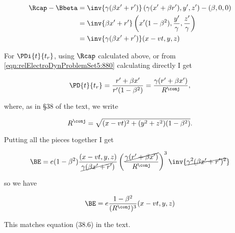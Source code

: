 \begin{align*}
\Rcap -\Bbeta
&= \inv{ \gamma (\beta x' + r') } \left( \gamma(x' + \beta r'), y', z' \right) - (\beta, 0, 0) \\
&= \inv{ \beta x' + r' } \left( x'(1- \beta^2), \frac{y'}{\gamma}, \frac{z'}{\gamma} \right) \\
&= \inv{\gamma (\beta x' + r')} ( x - v t, y, z)
\end{align*}

For $\PDi{t}{t_r}$, using $\Rcap$ calculated above, or from \ref{eqn:relElectroDynProblemSet5:880} calculating directly I get

\begin{equation}\label{eqn:relElectroDynProblemSet5:920}
\PD{t}{t_r} = \frac{r' + \beta x'}{r'(1 - \beta^2)} = \frac{\gamma( r' + \beta x') }{R^\conj},
\end{equation}

where, as in \S 38 of the text, we write

\begin{equation}\label{eqn:relElectroDynProblemSet5:1020}
R^\conj = \sqrt{ (x - vt)^2 + (y^2 + z^2)(1-\beta^2) }.
\end{equation}

Putting all the pieces together I get

\begin{align*}
\BE 
&= e (1 -\beta^2) \frac{(x - vt, y, z)}{\cancel{\gamma( \beta x' + r'})} \left( \frac{\cancel{\gamma( r' + \beta x')}}{R^\conj} \right)^3 \inv{\cancel{ \gamma^2 (\beta x' + r')^2 } } \\
\end{align*}

so we have

\begin{equation}\label{eqn:relElectroDynProblemSet5:1040}
\BE 
= e \frac{1 -\beta^2}{(R^\conj)^3} (x - vt, y, z) 
\end{equation}

This matches equation (38.6) in the text.  

\EndArticle
